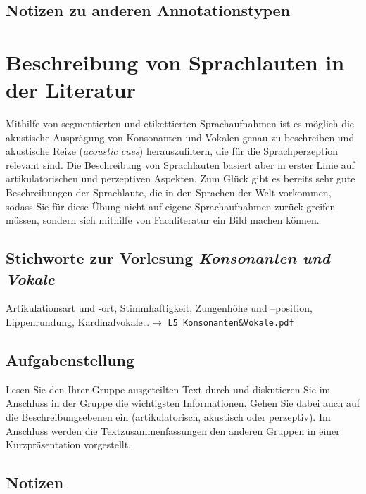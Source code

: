 \documentclass[11pt]{book}
\begin{document}
\section{Notizen zu anderen Annotationstypen} 






\chapter{Beschreibung von Sprachlauten in der Literatur}

Mithilfe von segmentierten und etikettierten Sprachaufnahmen ist es möglich die akustische Ausprägung von Konsonanten und Vokalen genau zu beschreiben und akustische Reize (\emph{acoustic cues}) herauszufiltern, die für die Sprachperzeption relevant sind. Die Beschreibung von Sprachlauten basiert aber in erster Linie auf artikulatorischen und perzeptiven Aspekten. Zum Glück gibt es bereits sehr gute Beschreibungen der Sprachlaute, die in den Sprachen der Welt vorkommen, sodass Sie für diese Übung nicht auf eigene Sprachaufnahmen zurück greifen müssen, sondern sich mithilfe von Fachliteratur ein Bild machen können.

\section{Stichworte zur Vorlesung \em{Konsonanten und Vokale}}
Artikulationsart und -ort, Stimmhaftigkeit, Zungenhöhe und –position, Lippenrundung, Kardinalvokale\dots $\rightarrow$ {\tt L5\underline{\ }Konsonanten{\&}Vokale.pdf}

\section{Aufgabenstellung}
Lesen Sie den Ihrer Gruppe ausgeteilten Text durch und diskutieren Sie im Anschluss in der Gruppe die wichtigsten Informationen. Gehen Sie dabei auch auf die Beschreibungsebenen ein (artikulatorisch, akustisch oder perzeptiv). Im Anschluss werden die Textzusammenfassungen den anderen Gruppen in einer Kurzpräsentation vorgestellt.
\newline
\section{Notizen}
\vspace*{10cm}
\end{document}
